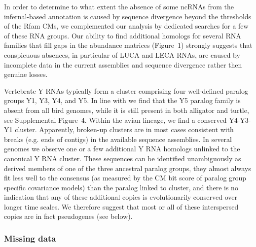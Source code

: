 \documentclass[10pt]{bmc_article}
\newenvironment{bmcformat}{\begin{raggedright}\baselineskip20pt\sloppy\setboolean{publ}{false}}{\end{raggedright}\baselineskip20pt\sloppy}
\begin{document}
\begin{bmcformat}
In order to determine to what extent the absence of some ncRNAs from
the infernal-based annotation is caused by sequence divergence beyond
the thresholds of the Rfam CMs, we complemented our analysis by
dedicated searches for a few of these RNA groups. Our ability to find
additional homologs for several RNA families that fill gaps in the
abundance matrices (Figure~1) strongly suggests that conspicuous
absences, in particular of LUCA and LECA RNAs, are caused by
incomplete data in the current assemblies and sequence divergence
rather then genuine losses.

Vertebrate Y RNAs typically form a cluster comprising four
well-defined paralog groups Y1, Y3, Y4, and Y5. In line with
\cite{Mosig:07a} we find that the Y5 paralog family is absent from all
bird genomes, while it is still present in both alligator and turtle,
see Supplemental Figure~4. Within the avian lineage, we find a
conserved Y4-Y3-Y1 cluster. Apparently, broken-up clusters are in most
cases consistent with breaks (e.g. ends of contigs) in the available
sequence assemblies.  In several genomes we observe one or a few
additional Y RNA homologs unlinked to the canonical Y RNA
cluster. These sequences can be identified unambiguously as derived
members of one of the three ancestral paralog groups, they almost
always fit less well to the consensus (as measured by the CM bit score
of paralog group specific covariance models) than the paralog linked
to cluster, and there is no indication that any of these additional
copies is evolutionarily conserved over longer time scales. We
therefore suggest that most or all of these interspersed copies are in
fact pseudogenes (see below).

\subsubsection*{Missing data}


\end{bmcformat}
\end{document}
